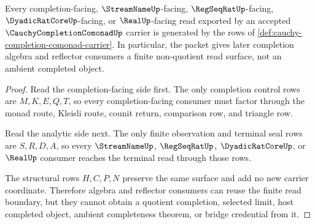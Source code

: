 \begin{theorem}
\label{thm:cauchy-completion-comonad-finite-read-boundary}
Every completion-facing, $\StreamNameUp$-facing, $\RegSeqRatUp$-facing, $\DyadicRatCoreUp$-facing, or $\RealUp$-facing read exported by an accepted $\CauchyCompletionComonadUp$ carrier is generated by the rows of \autoref{def:cauchy-completion-comonad-carrier}. In particular, the packet gives later completion algebra and reflector consumers a finite non-quotient read surface, not an ambient completed object.
\end{theorem}
\begin{proof}
Read the completion-facing side first. The only completion control rows are $M,K,E,Q,T$, so every completion-facing consumer must factor through the monad route, Kleisli route, counit return, comparison row, and triangle row.

Read the analytic side next. The only finite observation and terminal seal rows are $S,R,D,A$, so every $\StreamNameUp$, $\RegSeqRatUp$, $\DyadicRatCoreUp$, or $\RealUp$ consumer reaches the terminal read through those rows.

The structural rows $H,C,P,N$ preserve the same surface and add no new carrier coordinate. Therefore algebra and reflector consumers can reuse the finite read boundary, but they cannot obtain a quotient completion, selected limit, host completed object, ambient completeness theorem, or bridge credential from it.
\end{proof}


\begin{closurestatus}{\CauchyCompletionComonadUp}
  \theoryclosure{\seedClosure}
  \formalstatus{\unformalizedV}
\end{closurestatus}
